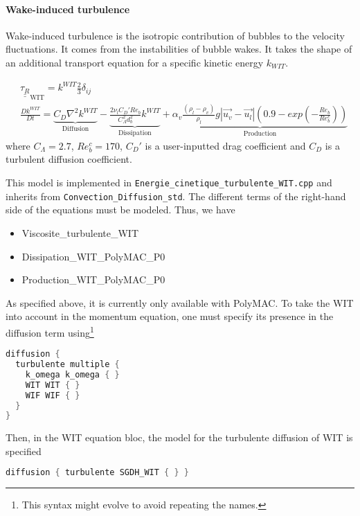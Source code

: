 \paragraph{Wake-induced turbulence}\mbox{}

Wake-induced turbulence is the isotropic contribution of bubbles to the velocity fluctuations. It comes from the instabilities of bubble wakes. It takes the shape of an additional transport equation for a specific kinetic energy $k_{WIT}$.

\begin{align}
	&\underline{\underline{\tau_R}}_{\text{WIT}} = k^{WIT}\frac{2}{3}\delta_{ij}\\
	&\frac{D k^{WIT}}{Dt} =
			\underbrace{C_D\nabla^2 k^{WIT} }_\text{Diffusion}
				- \underbrace{\frac{2 \nu_l C_D' Re_b}{C_\Lambda^2 d_b^2}k^{WIT} }_\text{Dissipation}
				+ \underbrace{\alpha_v \frac{(\rho_l-\rho_v)}{\rho_l} g |\vec{u_v}-\vec{u_l}|\left(0.9 - exp\left(-\frac{Re_b}{Re_b^c}\right)\right) }_\text{Production}
\end{align}
where $C_\Lambda = 2.7$, $Re_b^c = 170$, $C_D'$ is a user-inputted drag coefficient and $C_D$ is a turbulent diffusion coefficient.

This model is implemented in \texttt{Energie_cinetique_turbulente_WIT.cpp} and inherits from \texttt{Convection_Diffusion_std}. The different terms of the right-hand side of the equations must be modeled. Thus, we have
\begin{itemize}
    \item Viscosite_turbulente_WIT
    \item Dissipation_WIT_PolyMAC_P0
    \item Production_WIT_PolyMAC_P0
\end{itemize}

As specified above, it is currently only available with PolyMAC. To take the WIT into account in the momentum equation, one must specify its presence in the diffusion term using\footnote{This syntax might evolve to avoid repeating the names.}

\begin{lstlisting}[language=c++]
diffusion {
  turbulente multiple {
    k_omega k_omega { }
    WIT WIT { }
    WIF WIF { }
  }
}
\end{lstlisting}

Then, in the WIT equation bloc, the model for the turbulente diffusion of WIT is specified
\begin{lstlisting}[language=c++]
diffusion { turbulente SGDH_WIT { } }
\end{lstlisting}

